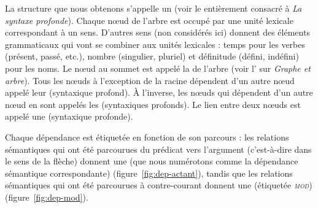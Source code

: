 La structure que nous obtenons s’appelle un 
(voir le  entièrement consacré à \textit{La syntaxe profonde}). Chaque nœud de l’arbre est occupé par une unité lexicale correspondant à un sens. D’autres sens (non considérés ici) donnent des éléments grammaticaux qui vont se combiner aux unités lexicales : temps pour les verbes (présent, passé, etc.), nombre (singulier, pluriel) et définitude (défini, indéfini) pour les noms. Le nœud au sommet est appelé la  de l’arbre (voir l’ sur \textit{Graphe et arbre}). Tous les nœuds à l’exception de la racine dépendent d’un autre nœud appelé leur  (syntaxique profond). À l’inverse, les nœuds qui dépendent d’un autre nœud en sont appelés les  (syntaxiques profonds). Le lien entre deux nœuds est appelé une  (syntaxique profonde).

Chaque dépendance est étiquetée en fonction de son parcours : les relations sémantiques qui ont été parcourues du prédicat vers l’argument (c'est-à-dire dans le sens de la flèche) donnent une  (que nous numérotons comme la dépendance sémantique correspondante) (figure~\ref{fig:dep-actant}), tandis que les relations sémantiques qui ont été parcourues à contre-courant donnent une  (étiquetée \textit{\textsc{mod}}) (figure~\ref{fig:dep-mod}).

